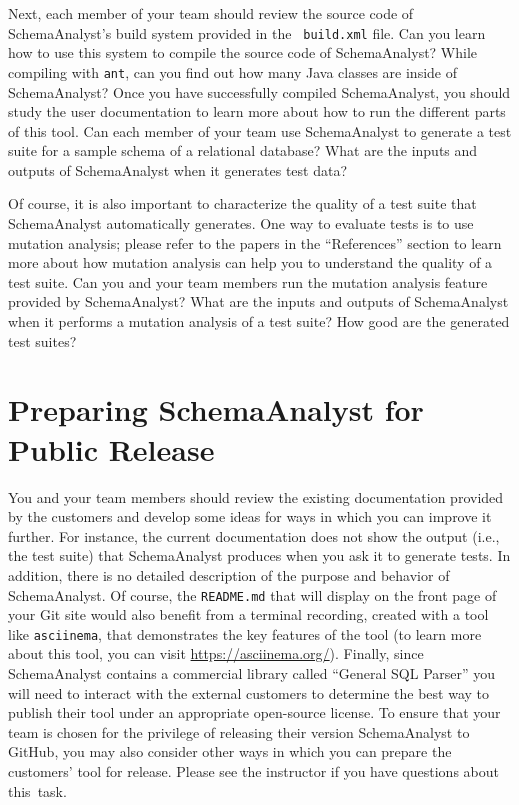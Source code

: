 Next, each member of your team should review the source code of SchemaAnalyst's build system provided in the {\tt
build.xml} file. Can you learn how to use this system to compile the source code of SchemaAnalyst? While compiling with
{\tt ant}, can you find out how many Java classes are inside of SchemaAnalyst? Once you have successfully compiled
SchemaAnalyst, you should study the user documentation to learn more about how to run the different parts of this tool.
Can each member of your team use SchemaAnalyst to generate a test suite for a sample schema of a relational database?
What are the inputs and outputs of SchemaAnalyst when it generates test data?

Of course, it is also important to characterize the quality of a test suite that SchemaAnalyst automatically generates.
One way to evaluate tests is to use mutation analysis; please refer to the papers in the ``References'' section to learn
more about how mutation analysis can help you to understand the quality of a test suite. Can you and your team members
run the mutation analysis feature provided by SchemaAnalyst? What are the inputs and outputs of SchemaAnalyst when it
performs a mutation analysis of a test suite? How good are the generated test suites?

\vspace*{-.05in}
\section*{Preparing SchemaAnalyst for Public Release}

You and your team members should review the existing documentation provided by the customers and develop some ideas for
ways in which you can improve it further. For instance, the current documentation does not show the output (i.e., the
test suite) that SchemaAnalyst produces when you ask it to generate tests. In addition, there is no detailed description
of the purpose and behavior of SchemaAnalyst. Of course, the {\tt README.md} that will display on the front page of your
Git site would also benefit from a terminal recording, created with a tool like {\tt asciinema}, that demonstrates the
key features of the tool (to learn more about this tool, you can visit \url{https://asciinema.org/}). Finally, since
SchemaAnalyst contains a commercial library called ``General SQL Parser'' you will need to interact with the external
customers to determine the best way to publish their tool under an appropriate open-source license. To ensure that your
team is chosen for the privilege of releasing their version SchemaAnalyst to GitHub, you may also consider other ways in
which you can prepare the customers' tool for release. Please see the instructor if you have questions about \mbox{this
task}.

